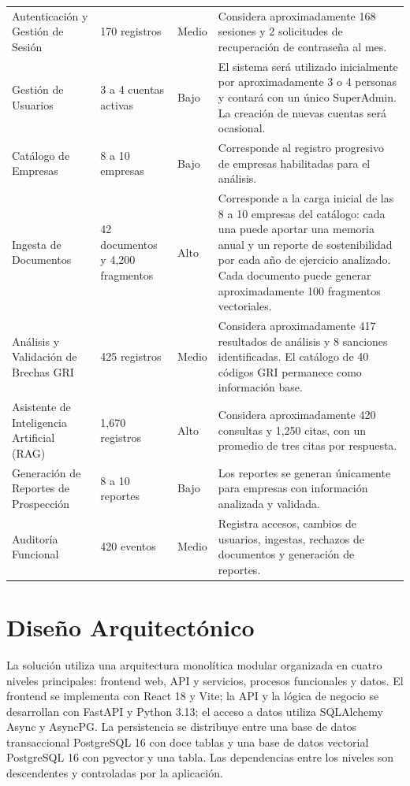 \begingroup\small
\begin{center}
\begin{tabular}{|L{4.6cm}|C{3.0cm}|C{1.5cm}|L{5.57cm}|}
\hline
{} &  &  &  \\
\hline
Autenticación y Gestión de Sesión & 170 registros & Medio & Considera aproximadamente 168 sesiones y 2 solicitudes de recuperación de contraseña al mes. \\
\hline
Gestión de Usuarios & 3 a 4 cuentas activas & Bajo & El sistema será utilizado inicialmente por aproximadamente 3 o 4 personas y contará con un único SuperAdmin. La creación de nuevas cuentas será ocasional. \\
\hline
Catálogo de Empresas & 8 a 10 empresas & Bajo & Corresponde al registro progresivo de empresas habilitadas para el análisis. \\
\hline
Ingesta de Documentos & 42 documentos y 4,200 fragmentos & Alto & Corresponde a la carga inicial de las 8 a 10 empresas del catálogo: cada una puede aportar una memoria anual y un reporte de sostenibilidad por cada año de ejercicio analizado. Cada documento puede generar aproximadamente 100 fragmentos vectoriales. \\
\hline
Análisis y Validación de Brechas GRI & 425 registros & Medio & Considera aproximadamente 417 resultados de análisis y 8 sanciones identificadas. El catálogo de 40 códigos GRI permanece como información base. \\
\hline
Asistente de Inteligencia Artificial (RAG) & 1,670 registros & Alto & Considera aproximadamente 420 consultas y 1,250 citas, con un promedio de tres citas por respuesta. \\
\hline
Generación de Reportes de Prospección & 8 a 10 reportes & Bajo & Los reportes se generan únicamente para empresas con información analizada y validada. \\
\hline
Auditoría Funcional & 420 eventos & Medio & Registra accesos, cambios de usuarios, ingestas, rechazos de documentos y generación de reportes. \\
\hline
\end{tabular}
\end{center}
\endgroup

\section{Diseño Arquitectónico}
La solución utiliza una arquitectura monolítica modular organizada en cuatro niveles principales: frontend web, API y servicios, procesos funcionales y datos. El frontend se implementa con React 18 y Vite; la API y la lógica de negocio se desarrollan con FastAPI y Python 3.13; el acceso a datos utiliza SQLAlchemy Async y AsyncPG. La persistencia se distribuye entre una base de datos transaccional PostgreSQL 16 con doce tablas y una base de datos vectorial PostgreSQL 16 con pgvector y una tabla. Las dependencias entre los niveles son descendentes y controladas por la aplicación.

